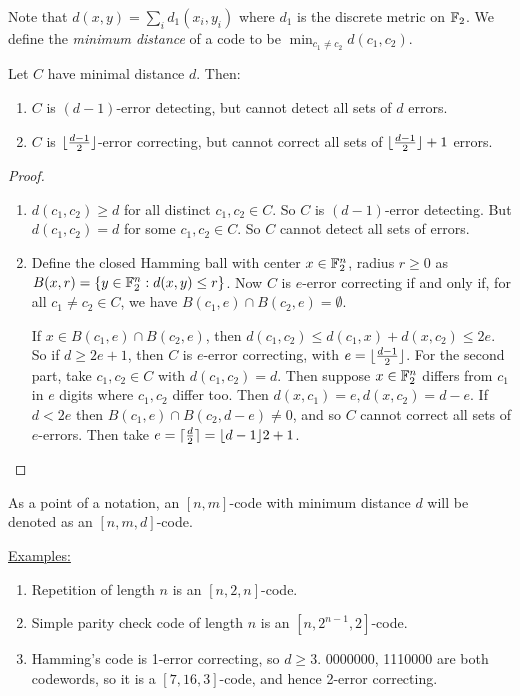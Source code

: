 \documentclass[10pt,a4paper]{article}
\begin{document}
Note that $d(x,y) = \sum_i d_1(x_i,y_i)$ where $d_1$ is the discrete metric on $\mathbb{F}_2$. We define the \emph{minimum distance} of a code to be $\min_{c_1 \neq c_2} d(c_1,c_2)$.

\begin{lemma}
Let $C$ have minimal distance $d$. Then:
\begin{enumerate}
\item $C$ is $(d-1)$-error detecting, but cannot detect all sets of $d$ errors.
\item $C$ is $\lfloor \frac{d-1}{2} \rfloor$-error correcting, but cannot correct all sets of $\lfloor \frac{d-1}{2} \rfloor+1$ errors.
\end{enumerate}
\end{lemma}
\begin{proof}
\item
\begin{enumerate}
\item $d(c_1,c_2) \geq d$ for all distinct $c_1, c_2 \in C$. So $C$ is $(d-1)$-error detecting. But $d(c_1, c_2)=d$ for some $c_1, c_2 \in C$. So $C$ cannot detect all sets of errors.

\item Define the closed Hamming ball with center $x \in \mathbb{F}_2^n$, radius $r\geq 0$ as $B(x,r) = \{y \in \mathbb{F}_2^n: d(x,y)\leq r\}$. Now $C$ is $e$-error correcting if and only if, for all $c_1 \neq c_2 \in C$, we have $B(c_1, e) \cap B(c_2, e) = \emptyset$.

If $x \in B(c_1,e) \cap B(c_2,e )$, then $d(c_1,c_2) \leq d(c_1,x)+d(x,c_2) \leq 2e$. So if $d \geq 2e+1$, then $C$ is $e$-error correcting, with $e = \lfloor \frac{d-1}{2} \rfloor$. For the second part, take $c_1, c_2 \in C$ with $d(c_1, c_2) = d$. Then suppose $x \in \mathbb{F}_2^n$ differs from $c_1$ in $e$ digits where $c_1, c_2$ differ too. Then $d(x,c_1) = e, d(x,c_2) = d-e$. If $d < 2e$ then $B(c_1, e) \cap B(c_2, d-e) \neq 0$, and so $C$ cannot correct all sets of $e$-errors. Then take $e = \lceil \frac{d}{2} \rceil = \lfloor d-1 \rfloor{2}+1$.
\end{enumerate}
\end{proof}
As a point of a notation, an $[n,m]$-code with minimum distance $d$ will be denoted as an $[n,m,d]$-code.

\hspace*{-1em}\underline{Examples:}
\begin{enumerate}
\item Repetition of length $n$ is an $[n,2,n]$-code.
\item Simple parity check code of length $n$ is an $[n, 2^{n-1}, 2]$-code.
\item Hamming's code is 1-error correcting, so $d\geq 3$. 0000000, 1110000 are both codewords, so it is a $[7,16,3]$-code, and hence 2-error correcting.
\end{enumerate}
\end{document}
